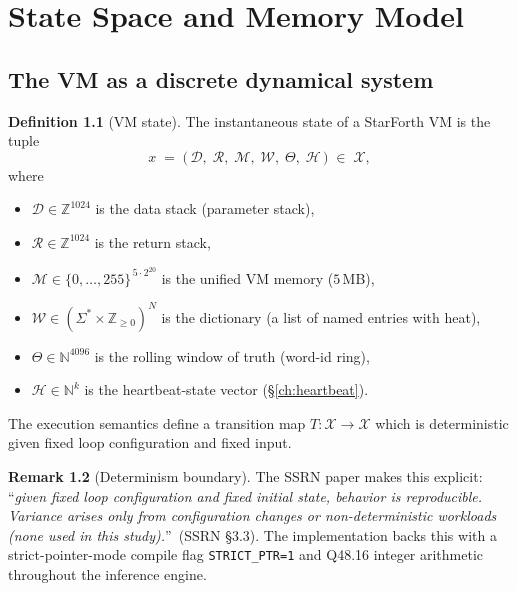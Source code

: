 \documentclass[11pt,letterpaper,openany]{book}
\theoremstyle{definition}
\newtheorem{definition}{Definition}[chapter]
\newtheorem{remark}[definition]{Remark}
\theoremstyle{plain}
\begin{document}
\chapter{State Space and Memory Model}
\label{ch:state-space}

\section{The VM as a discrete dynamical system}

\begin{definition}[VM state]\label{def:vm-state}
The instantaneous state of a StarForth VM is the tuple
\[
  x \;=\; \bigl(\,\mathcal{D},\;\mathcal{R},\;\mathcal{M},\;\mathcal{W},\;\Theta,\;\mathcal{H}\,\bigr) \;\in\; \mathcal{X},
\]
where
\begin{itemize}\setlength\itemsep{0pt}
  \item $\mathcal{D} \in \mathbb{Z}^{1024}$ is the data stack (parameter stack),
  \item $\mathcal{R} \in \mathbb{Z}^{1024}$ is the return stack,
  \item $\mathcal{M} \in \{0,\dots,255\}^{\,5\cdot 2^{20}}$ is the unified VM memory ($5$\,MB),
  \item $\mathcal{W} \in (\Sigma^* \times \mathbb{Z}_{\ge 0})^N$ is the dictionary (a list of named entries with heat),
  \item $\Theta \in \mathbb{N}^{4096}$ is the rolling window of truth (word-id ring),
  \item $\mathcal{H} \in \mathbb{N}^k$ is the heartbeat-state vector (\S\ref{ch:heartbeat}).
\end{itemize}
The execution semantics define a transition map $T:\mathcal{X}\to\mathcal{X}$
which is deterministic given fixed loop configuration and fixed input.
\end{definition}

\begin{remark}[Determinism boundary]
\label{rem:determinism}
The SSRN paper makes this explicit: ``\emph{given fixed loop configuration and
fixed initial state, behavior is reproducible. Variance arises only from
configuration changes or non-deterministic workloads (none used in this
study).}''~(SSRN \S3.3). The implementation backs this with a
strict-pointer-mode compile flag \texttt{STRICT\_PTR=1} and Q48.16 integer
arithmetic throughout the inference engine.
\end{remark}
\end{document}
